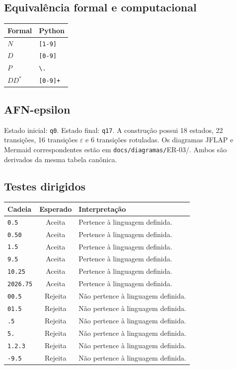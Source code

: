 \documentclass[12pt,a4paper,oneside]{report}
\begin{document}
\subsection{Equivalência formal e computacional}
\begin{center}
\small
\begin{tabular}{|p{}|p{}|}
\toprule
Formal & Python \\
\midrule
$N$ & \texttt{[1-9]} \\
$D$ & \texttt{[0-9]} \\
$P$ & \texttt{\textbackslash.} \\
$DD^*$ & \texttt{[0-9]+} \\
\bottomrule
\end{tabular}
\end{center}
\subsection{AFN-epsilon}
Estado inicial: \texttt{q0}. Estado final: \texttt{q17}. A construção possui 18 estados, 22 transições, 16 transições $\varepsilon$ e 6 transições rotuladas.
Os diagramas JFLAP e Mermaid correspondentes estão em \texttt{docs/diagramas/}ER-03/. Ambos são derivados da mesma tabela canônica.
\subsection{Testes dirigidos}
\begin{center}
\small
\begin{tabular}{|p{}|c|p{}|}
\toprule
Cadeia & Esperado & Interpretação \\
\midrule
\texttt{0.5} & Aceita & Pertence à linguagem definida. \\
\texttt{0.50} & Aceita & Pertence à linguagem definida. \\
\texttt{1.5} & Aceita & Pertence à linguagem definida. \\
\texttt{9.5} & Aceita & Pertence à linguagem definida. \\
\texttt{10.25} & Aceita & Pertence à linguagem definida. \\
\texttt{2026.75} & Aceita & Pertence à linguagem definida. \\
\texttt{00.5} & Rejeita & Não pertence à linguagem definida. \\
\texttt{01.5} & Rejeita & Não pertence à linguagem definida. \\
\texttt{.5} & Rejeita & Não pertence à linguagem definida. \\
\texttt{5.} & Rejeita & Não pertence à linguagem definida. \\
\texttt{1.2.3} & Rejeita & Não pertence à linguagem definida. \\
\texttt{-9.5} & Rejeita & Não pertence à linguagem definida. \\
\bottomrule
\end{tabular}
\end{center}
\end{document}
